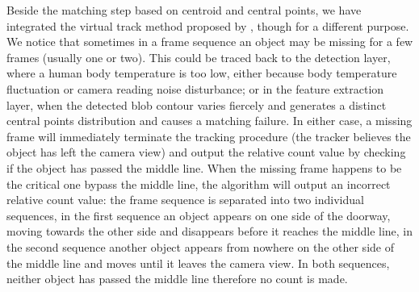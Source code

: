 Beside the matching step based on centroid and central points, we have integrated the virtual track method proposed by \cite{virtualtrack}, though for a different purpose. We notice that sometimes in a frame sequence an object may be missing for a few frames (usually one or two). This could be traced back to the detection layer, where a human body temperature is too low, either because body temperature fluctuation or camera reading noise disturbance; or in the feature extraction layer, when the detected blob contour varies fiercely and generates a distinct central points distribution and causes a matching failure. In either case, a missing frame will immediately terminate the tracking procedure (the tracker believes the object has left the camera view) and output the relative count value by checking if the object has passed the middle line. When the missing frame happens to be the critical one bypass the middle line, the algorithm will output an incorrect relative count value: the frame sequence is separated into two individual sequences, in the first sequence an object appears on one side of the doorway, moving towards the other side and disappears before it reaches the middle line, in the second sequence another object appears from nowhere on the other side of the middle line and moves until it leaves the camera view. In both sequences, neither object has passed the middle line therefore no count is made.

